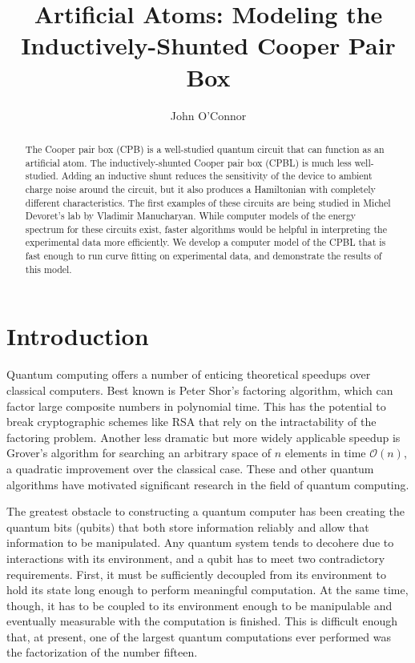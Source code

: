 \documentclass[twocolumn]{revtex4}
\begin{document}
\title{Artificial Atoms: Modeling the Inductively-Shunted Cooper Pair
  Box}
\author{John O'Connor}

\begin{abstract}
  The Cooper pair box (CPB) is a well-studied quantum circuit that can
  function as an artificial atom. The inductively-shunted Cooper pair
  box (CPBL) is much less well-studied. Adding an inductive shunt
  reduces the sensitivity of the device to ambient charge noise around
  the circuit, but it also produces a Hamiltonian with completely
  different characteristics. The first examples of these circuits are
  being studied in Michel Devoret's lab by Vladimir Manucharyan.
  While computer models of the energy spectrum for these circuits
  exist, faster algorithms would be helpful in interpreting the
  experimental data more efficiently. We develop a computer model of
  the CPBL that is fast enough to run curve fitting on experimental
  data, and demonstrate the results of this model.
\end{abstract}

\maketitle

\section{Introduction}

Quantum computing offers a number of enticing theoretical speedups
over classical computers. Best known is Peter Shor's factoring
algorithm\cite{Shor}, which can factor large composite numbers in
polynomial time. This has the potential to break cryptographic schemes
like RSA that rely on the intractability of the factoring
problem. Another less dramatic but more widely applicable speedup is
Grover's algorithm for searching an arbitrary space of $n$ elements in
time $\mathcal{O}(n)$, a quadratic improvement over the classical
case\cite{Grover}. These and other quantum algorithms have motivated
significant research in the field of quantum computing.

The greatest obstacle to constructing a quantum computer has been
creating the quantum bits (qubits) that both store information
reliably and allow that information to be manipulated. Any quantum
system tends to decohere due to interactions with its environment, and
a qubit has to meet two contradictory requirements. First, it must be
sufficiently decoupled from its environment to hold its state long
enough to perform meaningful computation. At the same time, though, it
has to be coupled to its environment enough to be manipulable and
eventually measurable with the computation is finished. This is
difficult enough that, at present, one of the largest quantum
computations ever performed was the factorization of the number
fifteen.\cite{Vandersypen}
\end{document}

